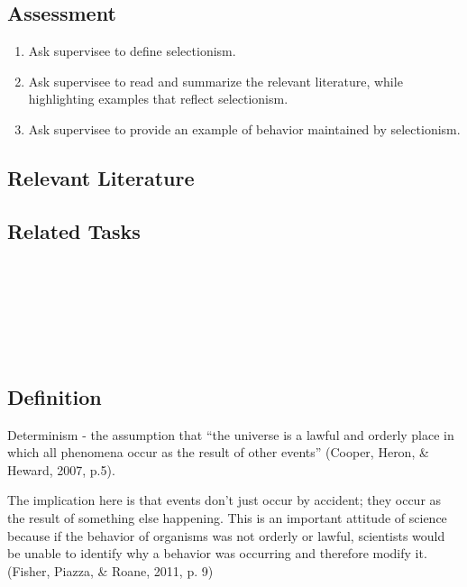 \subsection{Assessment}
\begin{enumerate}
\item Ask supervisee to define selectionism.
\item Ask supervisee to read and summarize the relevant literature, while highlighting examples that reflect selectionism.
\item Ask supervisee to provide an example of behavior maintained by selectionism.
%
\end{enumerate}
%
\subsection{Relevant Literature}
\begin{refsection}
\nocite{test,alang2017police,clayton2018black}
\printbibliography[heading=none]
\end{refsection}
%
\subsection{Related Tasks}
\fourFKFifteen{}\\
\fourFKThirtyOne{}\\
\fourFKThirtyThree{}\\
\fourFKFourtyOne{}\\
\fourFKFourtyTwo{}\\
%
%
%
%
%
%
%
\section{\fourFKThree{}}
\subsection{Definition}
Determinism - the assumption that ``the universe is a lawful and orderly place in which all phenomena occur as the result of other events'' (Cooper, Heron, \& Heward, 2007, p.5).

The implication here is that events don't just occur by accident; they occur as the result of something else happening. This is an important attitude of science because if the behavior of organisms was not orderly or lawful, scientists would be unable to identify why a behavior was occurring and therefore modify it. (Fisher, Piazza, \& Roane, 2011, p. 9) 

